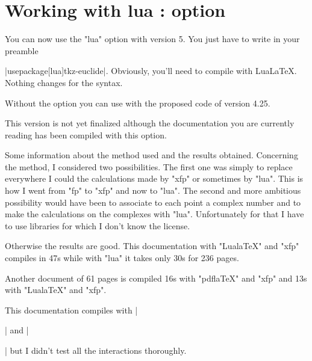 \newpage
\section{Working with lua : option } \label{calc_with_lua}

You can now use the "lua" option with \tkzname{\tkznameofpack} version 5.
You just have to write in your preamble

 |usepackage[lua]{tkz-euclide}|. 
 Obviously, you'll need to compile with LuaLaTeX. Nothing changes for the syntax.

Without the option you can use \tkzname{\tkznameofpack} with the proposed code of version 4.25.

This version is not yet finalized although the documentation you are currently reading has been compiled with this option.

Some information about the method used and the results obtained. Concerning the method, I considered two possibilities. The first one was simply to replace everywhere I could the calculations made by "xfp" or sometimes by "lua". This is how I went from "fp" to "xfp" and now to "lua". The second and more ambitious possibility would have been to associate to each point a complex number and to make the calculations on the complexes with "lua". Unfortunately for that I have to use libraries for which I don't know the license. 

Otherwise the results are good. This documentation with "LualaTeX" and "xfp" compiles in 47s while with "lua" it takes only 30s for 236 pages.

Another document of 61 pages is compiled 16s with "pdflaTeX" and "xfp" and 13s with "LualaTeX" and "xfp".

This documentation compiles with |\usepackage{tkz-base}|  and |\usepackage[lua]{tkz-euclide}| but I didn't test all the interactions thoroughly. 

\endinput